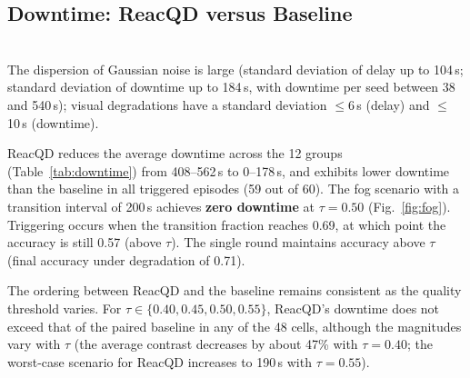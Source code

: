 \documentclass[conference]{IEEEtran}
\begin{document}
\subsection{Downtime: ReacQD versus Baseline}
\begin{table}[!t]
\centering
\caption{Downtime (s): ReacQD versus paired baseline without retraining (group averages over 5 seeds; format: reactive / baseline).}
\label{tab:downtime}
\small
{}
\vspace{5pt}
{\footnotesize \\The dispersion of Gaussian noise is large (standard deviation of delay up to 104\,s;
standard deviation of downtime up to 184\,s, with downtime per seed between 38 and 540\,s); visual degradations have a standard deviation
$\le$6\,s (delay) and $\le$10\,s (downtime).}
\end{table}
ReacQD reduces the average downtime across the 12 groups (Table~\ref{tab:downtime}) from 408--562\,s to 0--178\,s, and exhibits lower downtime than the baseline in all triggered episodes (59 out of 60). The fog scenario with a transition interval of 200\,s achieves \textbf{zero downtime} at $\tau=0.50$ (Fig.~\ref{fig:fog}). Triggering occurs when the transition fraction reaches 0.69, at which point the accuracy is still 0.57 (above $\tau$). The single round maintains accuracy above $\tau$ (final accuracy under degradation of 0.71).

The ordering between ReacQD and the baseline remains consistent as the quality threshold varies. For $\tau \in \{0.40, 0.45, 0.50, 0.55\}$, ReacQD’s downtime does not exceed that of the paired baseline in any of the 48 cells, although the magnitudes vary with $\tau$ (the average contrast decreases by about 47\% with $\tau=0.40$; the worst-case scenario for ReacQD increases to 190\,s with $\tau=0.55$).
\end{document}
